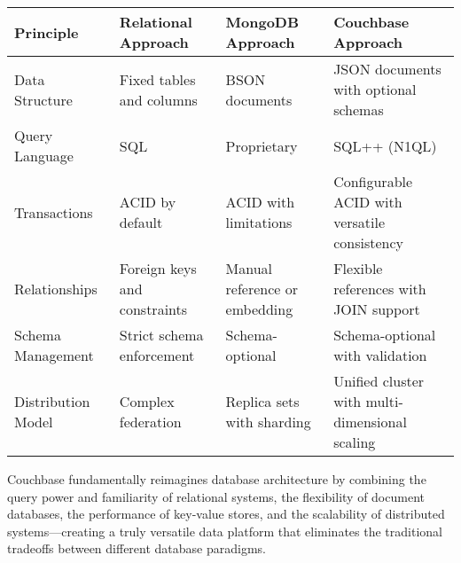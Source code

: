 \begin{tabular}{|p{3.2cm}|p{3.5cm}|p{3.5cm}|p{4cm}|}
\hline
\textbf{Principle} & \textbf{Relational Approach} & \textbf{MongoDB Approach} & \textbf{Couchbase Approach} \\
\hline
Data Structure & Fixed tables and columns & BSON documents & JSON documents with optional schemas \\
\hline
Query Language & SQL & Proprietary & SQL++ (N1QL) \\
\hline
Transactions & ACID by default & ACID with limitations & Configurable ACID with versatile consistency \\
\hline
Relationships & Foreign keys and constraints & Manual reference or embedding & Flexible references with JOIN support \\
\hline
Schema Management & Strict schema enforcement & Schema-optional & Schema-optional with validation \\
\hline
Distribution Model & Complex federation & Replica sets with sharding & Unified cluster with multi-dimensional scaling \\
\hline
\end{tabular}

Couchbase fundamentally reimagines database architecture by combining the query power and familiarity of relational systems, the flexibility of document databases, the performance of key-value stores, and the scalability of distributed systems—creating a truly versatile data platform that eliminates the traditional tradeoffs between different database paradigms.
